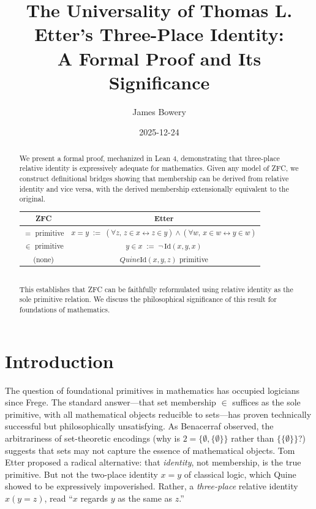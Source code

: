 \documentclass[11pt, a4paper]{article}
\title{The Universality of Thomas L. Etter's Three-Place Identity:\\A Formal Proof and Its Significance}
\author{James Bowery}
\date{2025-12-24}
\theoremstyle{remark}
\begin{document}
\maketitle

\begin{abstract}
    We present a formal proof, mechanized in Lean 4, demonstrating that three-place relative identity\cite{quine} is expressively adequate for mathematics. Given any model of ZFC, we construct definitional bridges showing that membership can be derived from relative identity and vice versa, with the derived membership extensionally equivalent to the original.
\begin{tabular}{|c|c|}
\hline
\textbf{ZFC} & \textbf{Etter} \\
\hline
$=$ primitive & $x = y \;:=\; (\forall z,\, z \in x \leftrightarrow z \in y) \land (\forall w,\, x \in w \leftrightarrow y \in w)$ \\
\hline
$\in$ primitive & $y \in x \;:=\; \neg\,\mathrm{Id}(x,y,x)$ \\
\hline
(none) & $Quine \mathrm{Id}(x,y,z)$ primitive \\
\hline
\end{tabular} \\
    This establishes that ZFC can be faithfully reformulated using relative identity as the sole primitive relation. We discuss the philosophical significance of this result for foundations of mathematics.
\end{abstract}

\section{Introduction}

The question of foundational primitives in mathematics has occupied logicians since Frege. The standard answer---that set membership $\in$ suffices as the sole primitive, with all mathematical objects reducible to sets---has proven technically successful but philosophically unsatisfying. As Benacerraf\cite{benacerraf} observed, the arbitrariness of set-theoretic encodings (why is $2 = \{\emptyset, \{\emptyset\}\}$ rather than $\{\{\emptyset\}\}$?) suggests that sets may not capture the essence of mathematical objects. Tom Etter\cite{etter_eq,etter_notes,etter_mem,etter_3pl} proposed a radical alternative: that \emph{identity}, not membership, is the true primitive. But not the two-place identity $x = y$ of classical logic, which Quine showed to be expressively impoverished. Rather, a \emph{three-place} relative identity $x(y = z)$, read ``$x$ regards $y$ as the same as $z$.''
\end{document}
